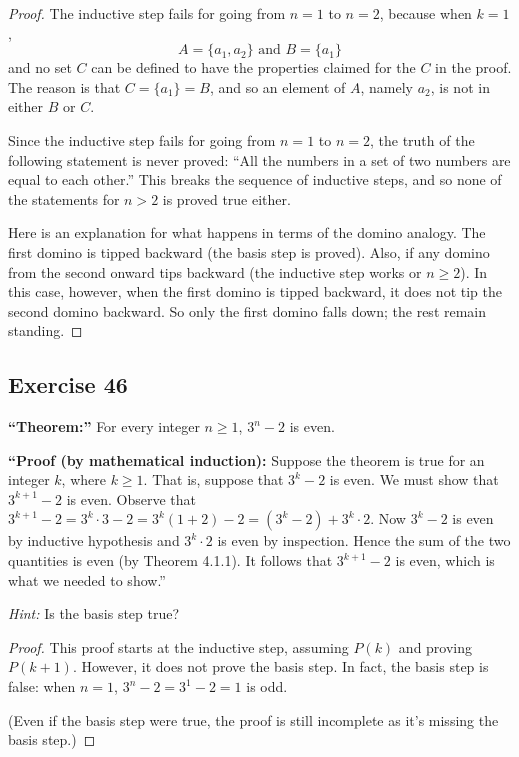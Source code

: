 \documentclass[14pt]{extarticle}
\begin{document}
\begin{proof}
The inductive step fails for going from $n = 1$ to $n = 2$,
because when $k = 1$,
\[
A = \{a_1, a_2\} \text{ and } B = \{a_1\}
\]
and no set $C$ can be defined to have the properties claimed for the $C$ in the proof. The reason is that $C = \{a_1\} = B$, and so an element of $A$, namely $a_2$, is
not in either $B$ or $C$.

Since the inductive step fails for going from $n = 1$ to $n = 2$, the truth of the following statement is never proved: “All the numbers in a set of two numbers are equal to each other.” This breaks the sequence of inductive steps, and so none of the statements for $n > 2$ is proved true either.

Here is an explanation for what happens in terms of the
domino analogy. The first domino is tipped backward (the basis step is proved). Also, if any domino from the second onward tips backward (the inductive step works or $n \geq 2$). In this case, however, when the first domino is tipped backward, it does not tip the second domino backward. So only the first domino falls down; the rest remain standing.
\end{proof}

\subsection{Exercise 46}
{\bf “Theorem:”} For every integer $n \geq 1$, $3^n - 2$ is even. 

{\bf “Proof (by mathematical induction):} Suppose the theorem is true for an integer $k$, where $k \geq 1$. That is, suppose that $3^k - 2$ is even. We must show that $3^{k+1} - 2$ is even. Observe that $3^{k+1} - 2 = 3^k \cdot 3 - 2 = 3^k(1 + 2) - 2 = (3^k - 2) + 3^k \cdot 2$. Now $3^k - 2$ is even by inductive hypothesis and $3^k \cdot 2$ is even by inspection. Hence the sum of the two quantities is even (by Theorem 4.1.1). It follows that $3^{k+1} - 2$ is even, which is what we needed to show.”

{\it Hint:} Is the basis step true?

\begin{proof}
This proof starts at the inductive step, assuming $P(k)$ and proving $P(k+1)$. However, it does not prove the basis step. In fact, the basis step is false: when $n = 1$, $3^n - 2 = 3^1 - 2 = 1$ is odd.

(Even if the basis step were true, the proof is still incomplete as it's missing the basis step.)
\end{proof}
\end{document}
